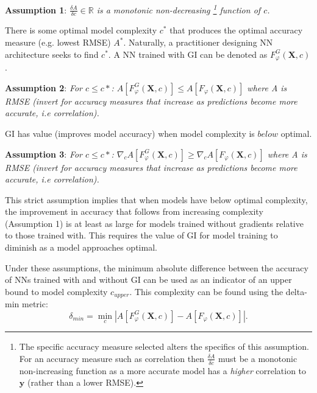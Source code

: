 \documentclass{article}
\begin{document}
\textbf{Assumption 1}: \textit{$\frac{\delta A}{\delta c} \in \mathbb{R}$ is a monotonic non-decreasing \footnote{The specific accuracy measure selected alters the specifics of this assumption. For an accuracy measure such as correlation then $\frac{\delta A}{\delta c}$ must be a monotonic non-increasing function as a more accurate model has a \textit{higher} correlation to $\mathbf{y}$ (rather than a lower RMSE).} function of $c$.}
 
There is some optimal model complexity $c^{*}$ that produces the optimal accuracy measure (e.g. lowest RMSE) $A^{*}$. Naturally, a practitioner designing NN architecture seeks to find $c^{*}$. A NN  trained with GI can be denoted as  $F_{\varphi}^{G}(\mathbf{X}, c)$. 
 
\textbf{ Assumption 2}: \textit{For $c \leq c*$: $A \left[ F_{\varphi}^{G}(\mathbf{X}, c) \right] \leq A \left[ F_{\varphi}(\mathbf{X}, c) \right]$ where A is RMSE (invert for accuracy measures that increase as predictions become more accurate, i.e correlation).}

GI has value (improves model accuracy) when model complexity is $\textit{below}$ optimal.
 
\textbf{ Assumption 3}: \textit{For $c \leq c*$: $\nabla_{c} A \left[ F_{\varphi}^{G}(\mathbf{X}, c) \right] \geq \nabla_{c} A \left[ F_{\varphi}(\mathbf{X}, c) \right]$ where A is RMSE (invert for accuracy measures that increase as predictions become more accurate, i.e correlation).}

This strict assumption implies that when models have below optimal complexity, the improvement in accuracy that follows from increasing complexity (Assumption 1) is at least as large for models trained without gradients relative to those trained with. This requires the value of GI for model training to diminish as a model approaches optimal. 


Under these assumptions, the minimum absolute difference between the accuracy of NNs trained with and without GI can be used as an indicator of an upper bound to model complexity $c_{upper}$. This complexity can be found using the delta-min metric:
 \begin{equation}
	\label{delta_min}
	\delta_{min} = \min_{c} |A \left[ F_{\varphi}^{G}(\mathbf{X}, c) \right] - A \left[ F_{\varphi}(\mathbf{X}, c) \right]|.
\end{equation}
\end{document}
